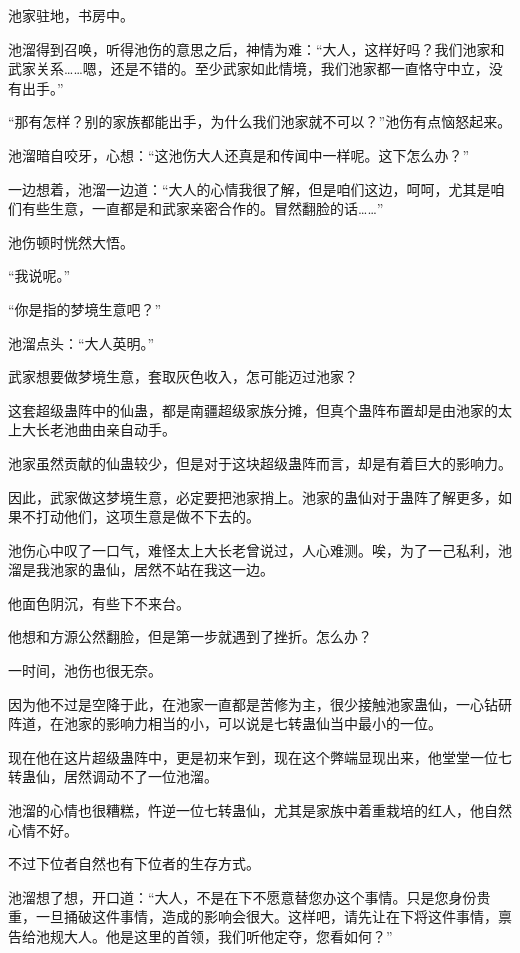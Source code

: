 
\begin{this_body}

池家驻地，书房中。

池溜得到召唤，听得池伤的意思之后，神情为难：“大人，这样好吗？我们池家和武家关系……嗯，还是不错的。至少武家如此情境，我们池家都一直恪守中立，没有出手。”

“那有怎样？别的家族都能出手，为什么我们池家就不可以？”池伤有点恼怒起来。

池溜暗自咬牙，心想：“这池伤大人还真是和传闻中一样呢。这下怎么办？”

一边想着，池溜一边道：“大人的心情我很了解，但是咱们这边，呵呵，尤其是咱们有些生意，一直都是和武家亲密合作的。冒然翻脸的话……”

池伤顿时恍然大悟。

“我说呢。”

“你是指的梦境生意吧？”

池溜点头：“大人英明。”

武家想要做梦境生意，套取灰色收入，怎可能迈过池家？

这套超级蛊阵中的仙蛊，都是南疆超级家族分摊，但真个蛊阵布置却是由池家的太上大长老池曲由亲自动手。

池家虽然贡献的仙蛊较少，但是对于这块超级蛊阵而言，却是有着巨大的影响力。

因此，武家做这梦境生意，必定要把池家捎上。池家的蛊仙对于蛊阵了解更多，如果不打动他们，这项生意是做不下去的。

池伤心中叹了一口气，难怪太上大长老曾说过，人心难测。唉，为了一己私利，池溜是我池家的蛊仙，居然不站在我这一边。

他面色阴沉，有些下不来台。

他想和方源公然翻脸，但是第一步就遇到了挫折。怎么办？

一时间，池伤也很无奈。

因为他不过是空降于此，在池家一直都是苦修为主，很少接触池家蛊仙，一心钻研阵道，在池家的影响力相当的小，可以说是七转蛊仙当中最小的一位。

现在他在这片超级蛊阵中，更是初来乍到，现在这个弊端显现出来，他堂堂一位七转蛊仙，居然调动不了一位池溜。

池溜的心情也很糟糕，忤逆一位七转蛊仙，尤其是家族中着重栽培的红人，他自然心情不好。

不过下位者自然也有下位者的生存方式。

池溜想了想，开口道：“大人，不是在下不愿意替您办这个事情。只是您身份贵重，一旦捅破这件事情，造成的影响会很大。这样吧，请先让在下将这件事情，禀告给池规大人。他是这里的首领，我们听他定夺，您看如何？”


\end{this_body}
